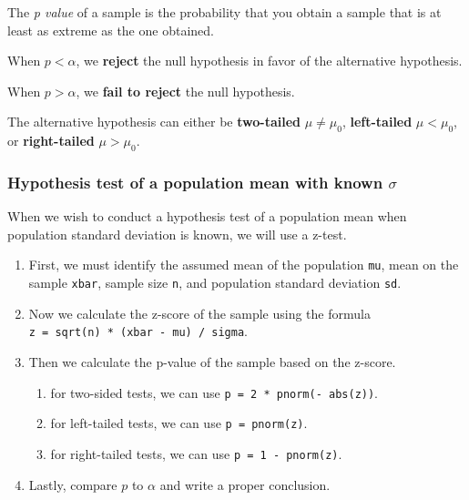 The \emph{p value} of a sample is the probability that you obtain a
sample that is at least as extreme as the one obtained.

When \(p < \alpha\), we \textbf{reject} the null hypothesis in favor of
the alternative hypothesis.

When \(p > \alpha\), we \textbf{fail to reject} the null hypothesis.

The alternative hypothesis can either be \textbf{two-tailed}
\(\mu \neq \mu_0\), \textbf{left-tailed} \(\mu < \mu_0\), or
\textbf{right-tailed} \(\mu > \mu_0\).

\hypertarget{hypothesis-test-of-a-population-mean-with-known-sigma}{%
\subsubsection{\texorpdfstring{Hypothesis test of a population mean with
known
\(\sigma\)}{Hypothesis test of a population mean with known \textbackslash sigma}}\label{hypothesis-test-of-a-population-mean-with-known-sigma}}

When we wish to conduct a hypothesis test of a population mean when
population standard deviation is known, we will use a z-test.

\begin{enumerate}
\def\labelenumi{\arabic{enumi}.}
\item
  First, we must identify the assumed mean of the population
  \texttt{mu}, mean on the sample \texttt{xbar}, sample size \texttt{n},
  and population standard deviation \texttt{sd}.
\item
  Now we calculate the z-score of the sample using the formula
  \texttt{z\ =\ sqrt(n)\ *\ (xbar\ -\ mu)\ /\ sigma}.
\item
  Then we calculate the p-value of the sample based on the z-score.

  \begin{enumerate}
  \def\labelenumii{\alph{enumii}.}
  \item
    for two-sided tests, we can use
    \texttt{p\ =\ 2\ *\ pnorm(-\ abs(z))}.
  \item
    for left-tailed tests, we can use \texttt{p\ =\ pnorm(z)}.
  \item
    for right-tailed tests, we can use \texttt{p\ =\ 1\ -\ pnorm(z)}.
  \end{enumerate}
\item
  Lastly, compare \(p\) to \(\alpha\) and write a proper conclusion.
\end{enumerate}

